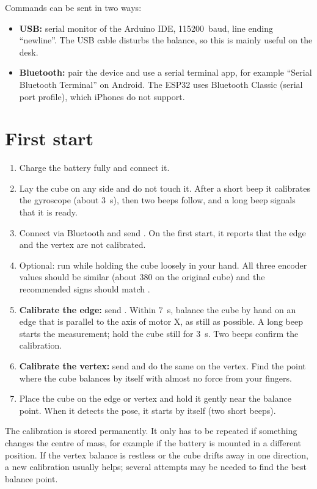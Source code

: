 Commands can be sent in two ways:
\begin{itemize}
  \item \textbf{USB:} serial monitor of the Arduino IDE, \SI{115200}{baud}, line ending
        \enquote{newline}. The USB cable disturbs the balance, so this is mainly useful on the
        desk.
  \item \textbf{Bluetooth:} pair the device  and use a serial terminal app, for
        example \enquote{Serial Bluetooth Terminal} on Android. The ESP32 uses Bluetooth Classic
        (serial port profile), which iPhones do not support.
\end{itemize}

\section{First start}

\begin{enumerate}
  \item Charge the battery fully and connect it.
  \item Lay the cube on any side and do not touch it. After a short beep it calibrates the
        gyroscope (about \SI{3}{s}), then two beeps follow, and a long beep signals that it is ready.
  \item Connect via Bluetooth and send . On the first start, it reports that the edge
        and the vertex are not calibrated.
  \item Optional: run  while holding the cube loosely in your hand. All three
        encoder values should be similar (about 380 on the original cube) and the recommended
        signs should match .
  \item \textbf{Calibrate the edge:} send . Within \SI{7}{s}, balance the cube by hand on
        an edge that is parallel to the axis of motor X, as still as possible. A long beep starts
        the measurement; hold the cube still for \SI{3}{s}. Two beeps confirm the calibration.
  \item \textbf{Calibrate the vertex:} send  and do the same on the vertex. Find the
        point where the cube balances by itself with almost no force from your fingers.
  \item Place the cube on the edge or vertex and hold it gently near the balance point. When it
        detects the pose, it starts by itself (two short beeps).
\end{enumerate}
The calibration is stored permanently. It only has to be repeated if something changes the
centre of mass, for example if the battery is mounted in a different position. If the vertex
balance is restless or the cube drifts away in one direction, a new  calibration
usually helps; several attempts may be needed to find the best balance point.

